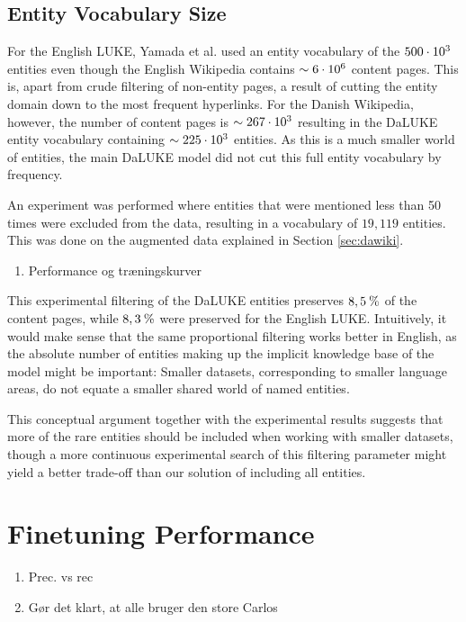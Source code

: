 \documentclass[main.tex]{subfiles}
\begin{document}
\subsection{Entity Vocabulary Size}
For the English LUKE, Yamada et al. used an entity vocabulary of the $500\cdot10^{3}$ entities \cite[Sec. 3.4]{yamada2020luke} even though the English Wikipedia contains $\sim 6\cdot10^{6}$ content pages\footnotemark.
This is, apart from crude filtering of non-entity pages, a result of cutting the entity domain down to the most frequent hyperlinks.
For the Danish Wikipedia, however, the number of content pages is $\sim 267\cdot10^{3}$ \footnotemark resulting in the DaLUKE entity vocabulary containing $\sim 225\cdot10^{3}$ entities.
As this is a much smaller world of entities, the main DaLUKE model did not cut this full entity vocabulary by frequency.

An experiment was performed where entities that were mentioned less than 50 times were excluded from the data, resulting in a vocabulary of $19,119$ entities.
This was done on the augmented data explained in Section \ref{sec:dawiki}.

\begin{enumerate}
    \item Performance og træningskurver
\end{enumerate}

This experimental filtering of the DaLUKE entities preserves $8,5\:\text{\%{}}$ of the content pages, while $8,3\:\text{\%{}}$ were preserved for the English LUKE.
Intuitively, it would make sense that the same proportional filtering works better in English, as the absolute number of entities making up the implicit knowledge base of the model might be important:
Smaller datasets, corresponding to smaller language areas, do not equate a smaller shared world of named entities.

This conceptual argument together with the experimental results suggests that more of the rare entities should be included when working with smaller datasets, though a more continuous experimental search of this filtering parameter might yield a better trade-off than our solution of including all entities.

\section{Finetuning Performance}
\label{sec:finetuning-exp}
\begin{enumerate}
    \item Prec. vs rec
    \item Gør det klart, at alle bruger den store Carlos
\end{enumerate}
\end{document}
